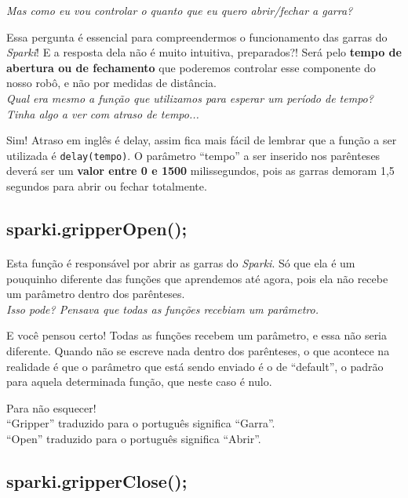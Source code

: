\textit{Mas como eu vou controlar o quanto que eu quero abrir/fechar a garra?} \par
Essa pergunta é essencial para compreendermos o funcionamento das garras do \textsl{Sparki}! E a resposta dela não é muito intuitiva, preparados?! Será pelo \textbf{tempo de abertura ou de fechamento} que poderemos controlar esse componente do nosso robô, e não por medidas de distância.\\

\textit{Qual era mesmo a função que utilizamos para esperar um período de tempo? Tinha algo a ver com atraso de tempo...} \par
Sim! Atraso em inglês é delay, assim fica mais fácil de lembrar que a função a ser utilizada é \lstinline[columns=fixed]{delay(tempo)}. O parâmetro ``tempo'' a ser inserido nos parênteses deverá ser um \textbf{valor entre 0 e 1500} milissegundos, pois as garras demoram 1,5 segundos para abrir ou fechar totalmente.

\subsection{sparki.gripperOpen();}

\paragraph{}
Esta função é responsável por abrir as garras do \textsl{Sparki}. Só que ela é um pouquinho diferente das funções que aprendemos até agora, pois ela não recebe um parâmetro dentro dos parênteses.\\

\textit{Isso pode? Pensava que todas as funções recebiam um parâmetro.} \par
E você pensou certo! Todas as funções recebem um parâmetro, e essa não seria diferente. Quando não se escreve nada dentro dos parênteses, o que acontece na realidade é que o parâmetro que está sendo enviado é o de ``default'', o padrão para aquela determinada função, que neste caso é nulo. 

    \begin{center}
    \textcolor{myblue}{Para não esquecer!}
   \\``Gripper'' traduzido para o português significa ``Garra''.
    \\``Open'' traduzido para o português significa ``Abrir''.
    \end{center}

\subsection{sparki.gripperClose();}

